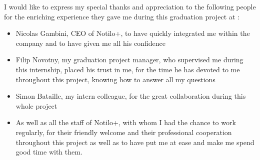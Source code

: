 \documentclass[
11pt, %
oneside, %
english, %
singlespacing, %
headsepline, %
]{MastersDoctoralThesis} %
\begin{document}

%
%




\begin{acknowledgements}
\addchaptertocentry{\acknowledgementname} %
I would like to express my special thanks and appreciation to the following people for the enriching
experience they gave me during this graduation project at \groupname:

\begin{itemize}
 \item Nicolas Gambini, CEO of Notilo+, to have quickly integrated me within the company and to have given me all his confidence
 \vspace*{3mm}
 \item Filip Novotny, my graduation project manager, who supervised me during this internship, placed his trust in me, for the time he has devoted to me throughout this project, knowing how to answer all my questions
 \vspace*{3mm}
 \item Simon Bataille, my intern colleague, for the great collaboration during this whole project
 \vspace*{3mm}
 \item As well as all the staff of Notilo+, with whom I had the chance to work regularly, for their friendly welcome and their professional cooperation throughout this project as well as to have put me at ease and make me spend good time with them.
\end{itemize}
\end{acknowledgements}
\end{document}
